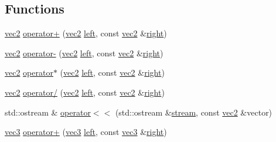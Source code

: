 \subsection*{Functions}
\begin{DoxyCompactItemize}
\item 
\hyperlink{structu__engine_1_1maths_1_1vec2}{vec2} \hyperlink{namespaceu__engine_1_1maths_af706ff2fa7f3159252e89962677b7927}{operator+} (\hyperlink{structu__engine_1_1maths_1_1vec2}{vec2} \hyperlink{glew_8h_a6358510bdde486b81c7951ee5c470ee4}{left}, const \hyperlink{structu__engine_1_1maths_1_1vec2}{vec2} \&\hyperlink{glew_8h_a18826d74cd7b4e758c25b4ba66e20be2}{right})
\item 
\hyperlink{structu__engine_1_1maths_1_1vec2}{vec2} \hyperlink{namespaceu__engine_1_1maths_af0a4764e710da0fc93a4f86e87dcabe7}{operator-\/} (\hyperlink{structu__engine_1_1maths_1_1vec2}{vec2} \hyperlink{glew_8h_a6358510bdde486b81c7951ee5c470ee4}{left}, const \hyperlink{structu__engine_1_1maths_1_1vec2}{vec2} \&\hyperlink{glew_8h_a18826d74cd7b4e758c25b4ba66e20be2}{right})
\item 
\hyperlink{structu__engine_1_1maths_1_1vec2}{vec2} \hyperlink{namespaceu__engine_1_1maths_a5e66adfe6195e1d03ea4242de39db68a}{operator$\ast$} (\hyperlink{structu__engine_1_1maths_1_1vec2}{vec2} \hyperlink{glew_8h_a6358510bdde486b81c7951ee5c470ee4}{left}, const \hyperlink{structu__engine_1_1maths_1_1vec2}{vec2} \&\hyperlink{glew_8h_a18826d74cd7b4e758c25b4ba66e20be2}{right})
\item 
\hyperlink{structu__engine_1_1maths_1_1vec2}{vec2} \hyperlink{namespaceu__engine_1_1maths_a1f7447be74c676613ab8fa948869b231}{operator/} (\hyperlink{structu__engine_1_1maths_1_1vec2}{vec2} \hyperlink{glew_8h_a6358510bdde486b81c7951ee5c470ee4}{left}, const \hyperlink{structu__engine_1_1maths_1_1vec2}{vec2} \&\hyperlink{glew_8h_a18826d74cd7b4e758c25b4ba66e20be2}{right})
\item 
std\+::ostream \& \hyperlink{namespaceu__engine_1_1maths_a326606ab3a13a1fc4c9397fdd2cd0bff}{operator$<$$<$} (std\+::ostream \&\hyperlink{glew_8h_a10d3bc96cdfc1d478f52c13d5ffd9316}{stream}, const \hyperlink{structu__engine_1_1maths_1_1vec2}{vec2} \&vector)
\item 
\hyperlink{structu__engine_1_1maths_1_1vec3}{vec3} \hyperlink{namespaceu__engine_1_1maths_aad42671b542feffba3bdc837b5c975f0}{operator+} (\hyperlink{structu__engine_1_1maths_1_1vec3}{vec3} \hyperlink{glew_8h_a6358510bdde486b81c7951ee5c470ee4}{left}, const \hyperlink{structu__engine_1_1maths_1_1vec3}{vec3} \&\hyperlink{glew_8h_a18826d74cd7b4e758c25b4ba66e20be2}{right})

\end{DoxyCompactItemize}
